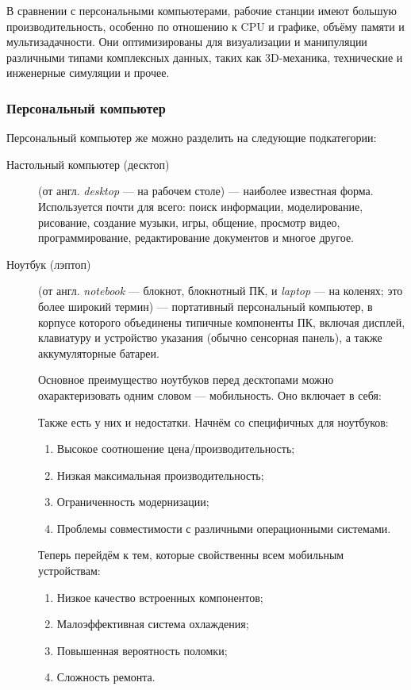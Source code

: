 В сравнении с персональными компьютерами, рабочие станции имеют большую производительность, особенно по отношению к CPU и графике, объёму памяти и мультизадачности.
Они оптимизированы для визуализации и манипуляции различными типами комплексных данных, таких как 3D-механика, технические и инженерные симуляции и прочее.

\subsubsection{Персональный компьютер}\label{base:introduction:computer:classification:pc}
Персональный компьютер же можно разделить на следующие подкатегории:
\begin{description}
 \item[Настольный компьютер (десктоп)] (от англ. \emph{desktop} --- на рабочем столе) --- наиболее известная форма. Используется почти для всего: поиск информации, моделирование, рисование, создание музыки, игры, общение, просмотр видео, программирование, редактирование документов и многое другое.
 \item[Ноутбук (лэптоп)] (от англ. \emph{notebook} --- блокнот, блокнотный ПК, и \emph{laptop} --- на коленях; это более широкий термин) --- портативный персональный компьютер, в корпусе которого объединены типичные компоненты ПК, включая дисплей, клавиатуру и устройство указания (обычно сенсорная панель), а также аккумуляторные батареи.
 
  Основное преимущество ноутбуков перед десктопами можно охарактеризовать одним словом --- мобильность. Оно включает в себя:
  Также есть у них и недостатки. Начнём со специфичных для ноутбуков:
  \begin{enumerate}
   \item Высокое соотношение цена/производительность;
   \item Низкая максимальная производительность;
   \item Ограниченность модернизации;
   \item Проблемы совместимости с различными операционными системами.
  \end{enumerate}   
  Теперь перейдём к тем, которые свойственны всем мобильным уст\-ройствам:
  \begin{enumerate}
   \item Низкое качество встроенных компонентов;
   \item Малоэффективная система охлаждения;
   \item Повышенная вероятность поломки;
   \item Сложность ремонта.
  \end{enumerate}
  

\end{description}
